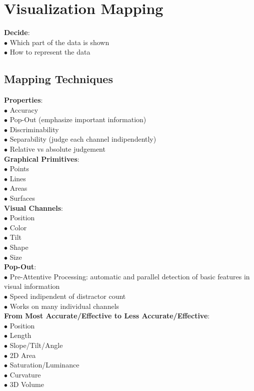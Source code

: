 \section{Visualization Mapping}
\textbf{Decide}: \\
$\bullet$ Which part of the data is shown \\
$\bullet$ How to represent the data \\

\subsection{Mapping Techniques}

\textbf{Properties}: \\
$\bullet$ Accuracy \\
$\bullet$ Pop-Out (emphasize important information) \\
$\bullet$ Discriminability \\
$\bullet$ Separability (judge each channel indipendently) \\
$\bullet$ Relative vs absolute judgement \\

\textbf{Graphical Primitives}: \\
$\bullet$ Points \\
$\bullet$ Lines \\
$\bullet$ Areas \\
$\bullet$ Surfaces \\

\textbf{Visual Channels}: \\
$\bullet$ Position \\
$\bullet$ Color \\
$\bullet$ Tilt \\
$\bullet$ Shape \\
$\bullet$ Size \\

\textbf{Pop-Out}: \\
$\bullet$ Pre-Attentive Processing: automatic and parallel detection of basic features in visual information \\
$\bullet$ Speed indipendent of distractor count \\
$\bullet$ Works on many individual channels \\

\textbf{From Most Accurate/Effective to Less Accurate/Effective}: \\
$\bullet$ Position \\
$\bullet$ Length \\
$\bullet$ Slope/Tilt/Angle \\
$\bullet$ 2D Area \\
$\bullet$ Saturation/Luminance \\
$\bullet$ Curvature \\
$\bullet$ 3D Volume \\
